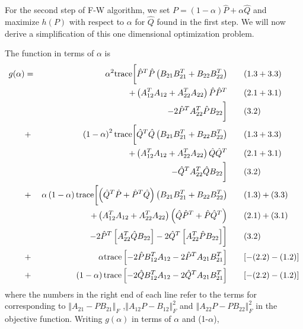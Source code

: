 \documentclass[12pt,oneside,final]{thesis}\usepackage[]{graphicx}\usepackage[]{color}
\begin{document}
For the second step of F-W algorithm, we set  $P=(1-\alpha) \hat{P}+ \alpha\hat{Q}$ and maximize $h(P)$ with respect to $\alpha$ for $\hat{Q}$ found in the first step. We will now derive a simplification of this one dimensional optimization problem.

The function in terms of $\alpha$ is
\begin{align*}
g(\alpha) & = & \alpha^{2}  \tr\biggl[\hat{P}^{T}\hat{P}\left(B_{21}B_{21}^{T}+B_{22}B_{22}^{T}\right)  & \qquad(1.3+3.3) \\
 &  & +\left(A_{12}^{T}A_{12}+A_{22}^{T}A_{22}\right)\hat{P}\hat{P}^{T} & \qquad (2.1+3.1)\\
 &  &   -2\hat{P}^{T}A_{22}^{T}\hat{P}B_{22}\biggr] & \qquad (3.2)\\ %
 & +  & \left(1-\alpha\right)^{2}  \tr\biggl[\hat{Q}^{T}\hat{Q}\left(B_{21}B_{21}^{T}+B_{22}B_{22}^{T}\right) & \qquad (1.3+3.3) \\
 &  & +\left(A_{12}^{T}A_{12}+A_{22}^{T}A_{22}\right)\hat{Q}\hat{Q}^{T} &  \qquad (2.1+3.1)\\
 &  &   -\hat{Q}^{T}A_{22}^{T}\hat{Q}B_{22}\biggr] & \qquad (3.2)\\ %
 & + & \alpha\left(1-\alpha\right)  \tr \biggl[ \left(\hat{Q}^{T}\hat{P}+\hat{P}^{T}\hat{Q}\right)\left(B_{21}B_{21}^{T}+B_{22}B_{22}^{T}\right) & \qquad  (1.3)+(3.3) \\
 &  & +\left(A_{12}^{T}A_{12}+A_{22}^{T}A_{22}\right)\left(\hat{Q}\hat{P}^{T}+\hat{P}\hat{Q}^{T}\right)& \qquad (2.1)+(3.1)\\
 &  & -2\hat{P}^{T}\left[A_{22}^{T}\hat{Q}B_{22}\right]-2\hat{Q}^{T}\left[A_{22}^{T}\hat{P}B_{22}\right] \biggr] & \qquad (3.2)\\
 & + & \alpha  \tr\left[-2\hat{P}B_{12}^{T}A_{12}-2\hat{P}^{T}A_{21}B_{21}^{T}\right] &\qquad [-(2.2)-(1.2)]\\
 & + & \left(1-\alpha\right)  \tr\left[-2\hat{Q}B_{12}^{T}A_{12}-2\hat{Q}^{T}A_{21}B_{21}^{T}\right] &  \qquad [-(2.2)-(1.2)]
\end{align*}
where the  numbers in the right end of each line refer to the
terms for corresponding to $\left\Vert A_{21}-PB_{21}\right\Vert _{F}$
,$\left\Vert A_{12}P-B_{12}\right\Vert _{F}^2$ and $\left\Vert A_{22}P-PB_{22}\right\Vert _{F}^2$
in the objective function. Writing $g\left(\alpha\right)$ in terms
of $\alpha$ and (1-$\alpha$),
\end{document}

